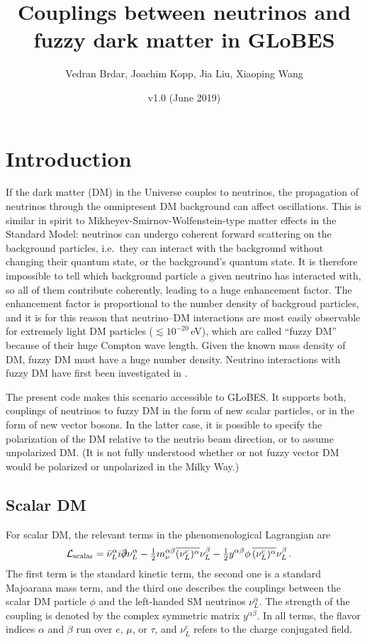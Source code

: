 \documentclass{scrartcl}
\title{Couplings between neutrinos and fuzzy dark matter in GLoBES}
\author{Vedran Brdar, Joachim Kopp, Jia Liu, Xiaoping Wang}
\date{v1.0 (June 2019)}
\begin{document}
\maketitle

\section{Introduction}

If the dark matter (DM) in the Universe couples to neutrinos, the propagation
of neutrinos through the omnipresent DM background can affect oscillations.
This is similar in spirit to Mikheyev-Smirnov-Wolfenstein-type matter effects
in the Standard Model: neutrinos can undergo coherent forward scattering on
the background particles, i.e.\ they can interact with the background
without changing their quantum state, or the background's quantum state. It
is therefore impossible to tell which background particle a given neutrino
has interacted with, so all of them contribute coherently, leading to
a huge enhancement factor. The enhancement factor is proportional to the
number density of backgroud particles, and it is for this reason that
neutrino--DM interactions are most easily observable for extremely light DM
particles ($\lesssim 10^{-20}$\,eV), which are called ``fuzzy DM'' because of
their huge Compton wave length. Given the known mass density of DM,
fuzzy DM must have a huge number density.  Neutrino interactions with fuzzy DM
have first been investigated in \cite{Berlin:2016woy, Krnjaic:2017zlz,
Brdar:2017kbt}.

The present code makes this scenario accessible to GLoBES.
It supports both, couplings of neutrinos to fuzzy DM in the form of new
scalar particles, or in the form of new vector bosons. In the latter case,
it is possible to specify the polarization of the DM relative to the neutrio
beam direction, or to assume unpolarized DM.  (It is not fully understood
whether or not fuzzy vector DM would be polarized or unpolarized in the Milky
Way.)


\subsection{Scalar DM}

For scalar DM, the relevant terms in the phenomenological Lagrangian are
\cite{Brdar:2017kbt}
\begin{align}
  \mathcal{L}_\text{scalar}
    &= \bar\nu_L^\alpha i \slashed\partial \nu_L^\alpha
     - \tfrac{1}{2} m_\nu^{\alpha\beta} \overline{(\nu_L^c)^\alpha} \nu_L^\beta
     - \tfrac{1}{2} y^{\alpha\beta} \phi \, \overline{(\nu_L^c)^\alpha} \nu_L^\beta \,.
  \label{eq:L-scalar}
\end{align}
The first term is the standard kinetic term, the second one is a standard
Majoarana mass term, and the third one describes the couplings between
the scalar DM particle $\phi$ and the left-handed SM neutrinos
$\nu_L^\alpha$. The strength of the coupling is denoted by the complex symmetric
matrix $y^{\alpha\beta}$.
In all terms, the flavor indices $\alpha$ and $\beta$
run over $e$, $\mu$, or $\tau$, and $\nu_L^c$ refers to the charge conjugated
field.
\end{document}
